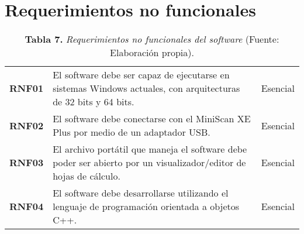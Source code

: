 \section{Requerimientos no funcionales}
\FloatBarrier
\vline
	\begin{table}[htb]
		\small
		\caption{\textbf{Tabla 7.} \textit{Requerimientos no funcionales del software} (Fuente: Elaboraci\'{o}n propia).}
		\centering
		\setlength{\extrarowheight}{5pt}
		\begin{tabulary}{15cm}{|c|L|c|}
			\hline
			 &  & \\ \hline
			\textbf{RNF01} & El software debe ser capaz de ejecutarse en sistemas Windows actuales, con arquitecturas de 32 bits y 64 bits. & Esencial\\ \hline
			\textbf{RNF02} & El software debe conectarse con el MiniScan XE Plus por medio de un adaptador USB. & Esencial\\ \hline
			\textbf{RNF03} & El archivo port\'{a}til que maneja el software debe poder ser abierto por un visualizador/editor de hojas de c\'{a}lculo. & Esencial\\ \hline
			\textbf{RNF04} & El software debe desarrollarse utilizando el lenguaje de programaci\'{o}n orientada a objetos C++. & Esencial\\ \hline
		\end{tabulary}
	\end{table}
\FloatBarrier %